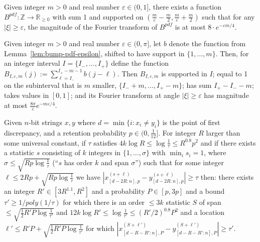 \documentclass[10pt,a4paper]{amsart}
\newcommand{\eps}{\varepsilon}
\begin{document}
\begin{lemma}\label{lem:bump-pdf-epsilon}
Given integer $m >0$ and real number $\eps\in(0,1]$, there exists a function $B^{pdf}:\mathbb{Z}\rightarrow\mathbb{R_{\geq 0}}$ with sum 1 and supported on $(\frac{m}{\eps} - \frac{m}{2}, \frac{m}{\eps} + \frac{m}{2})$ such that for any $|\xi|\geq \eps$, the magnitude of the Fourier transform of $B^{pdf}$ is at most $8\cdot e^{-\eps m/4}$. 
\end{lemma}

\begin{lemma}\label{lem:cumulative-epsilon}
Given integer $m>0$ and real number $\eps\in(0,\pi]$, let $b$ denote the function from Lemma~\ref{lem:bump-pdf-epsilon}, shifted to have support in $\{1,\ldots,m\}$. Then, for an integer interval $I=\{I_-,\ldots,I_+\}$ define the function $B_{I,\eps,m}(j):=\sum_{\ell=I_-}^{I_+-m-1} b(j-\ell)$. Then $B_{I,\eps,m}$ is supported in $I$; equal to 1 on the subinterval that is $m$ smaller, $\{I_-+m,\ldots,I_+-m\}$; has sum $I_+-I_- -m$; takes values in $[0,1]$; and its Fourier transform at angle $|\xi|\geq \eps$ has magnitude at most $\frac{8\pi}{\eps} e^{-m\eps/4}$.
\end{lemma}

\begin{proposition}\label{prop:induction}
Given $n$-bit strings $x,y$ where $d=\min\{i:x_i\neq y_i\}$ is the point of first discrepancy, and a retention probability $p\in(0,\frac{1}{12}]$. For integer $R$ larger than some universal constant, if $\tau$ satisfies $4k\log R\leq \log\frac{1}{\tau}\leq R^{0.8}p^2$ and if there exists a statistic $s$ consisting of $k$ integers in $\{1,\ldots,\sigma\}$ with $\min_i s_i=1$, where $\sigma\leq  \sqrt{Rp\log\frac{1}{\tau}}$  
(``$s$ has order $k$ and span $\sigma$'') such that for some integer $\ell\leq 2Rp+ \sqrt{R p\log\frac{1}{\tau}}$ we have $|x_{[d-2R:n],p}^{(s+\ell)}-y_{[d-2R:n],p}^{(s+\ell)}|\geq \tau$ then: there exists an integer $R'\in[3R^{1.1},R^{2}]$ and a probability $P\in [p,3p]$ and a bound $\tau'\geq 1/poly(1/\tau)$ for which there is an order $\leq 3k$ statistic $S$ of span $\leq  \sqrt{\frac{1}{2}R'P\log\frac{1}{\tau'}}$ and $12k\log R'\leq \log\frac{1}{\tau'}\leq ({R'}/2)^{0.8}P^2$ and a location $\ell'\leq R'P+ \sqrt{\frac{1}{2}R' P\log\frac{1}{\tau'}}$ for which $|x_{[d-R-R':n],P}^{(S+\ell')}-y_{[d-R-R':n],P}^{(S+\ell')}|\geq \tau'$.
\end{proposition}
\end{document}
